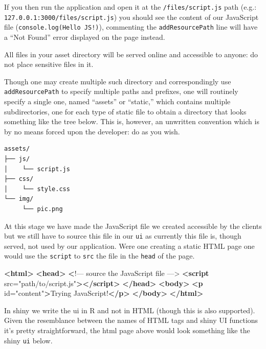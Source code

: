 \documentclass[
]{krantz}
\makeatletter
\newenvironment{Shaded}{\begin{snugshade}}{\end{snugshade}}
\newcommand{\ErrorTok}[1]{\textcolor[rgb]{0.14,0.14,0.14}{\textbf{#1}}}
\newcommand{\KeywordTok}[1]{\textcolor[rgb]{0.27,0.27,0.27}{\textbf{#1}}}
\newcommand{\NormalTok}[1]{#1}
\newcommand{\OtherTok}[1]{\textcolor[rgb]{0.37,0.37,0.37}{#1}}
\newcommand{\StringTok}[1]{\textcolor[rgb]{0.5,0.5,0.5}{#1}}
\newenvironment{kframe}{%
\medskip{}
\setlength{\fboxsep}{.8em}
 \def\at@end@of@kframe{}%
 \ifinner\ifhmode%
  \def\at@end@of@kframe{\end{minipage}}%
  \begin{minipage}{\columnwidth}%
 \fi\fi%
 \def\FrameCommand##1{\hskip\@totalleftmargin \hskip-\fboxsep
 \colorbox{shadecolor}{##1}\hskip-\fboxsep
     \hskip-\linewidth \hskip-\@totalleftmargin \hskip\columnwidth}%
 \MakeFramed {\advance\hsize-\width
   \@totalleftmargin\z@ \linewidth\hsize
   \@setminipage}}%
 {\par\unskip\endMakeFramed%
 \at@end@of@kframe}
\renewenvironment{Shaded}{\begin{kframe}}{\end{kframe}}
\makeatother
\begin{document}
If you then run the application and open it at the \texttt{/files/script.js} path (e.g.: \texttt{127.0.0.1:3000/files/script.js}) you should see the content of our JavaScript file (\texttt{console.log(\textquotesingle{}Hello\ JS!\textquotesingle{})}), commenting the \texttt{addResourcePath} line will have a ``Not Found'' error displayed on the page instead.

All files in your asset directory will be served online and accessible to anyone: do not place sensitive files in it.

Though one may create multiple such directory and correspondingly use \texttt{addResourcePath} to specify multiple paths and prefixes, one will routinely specify a single one, named ``assets'' or ``static,'' which contains multiple subdirectories, one for each type of static file to obtain a directory that looks something like the tree below. This is, however, an unwritten convention which is by no means forced upon the developer: do as you wish.

\begin{verbatim}
assets/
├── js/
│    └── script.js
├── css/
│    └── style.css
└── img/
     └── pic.png
\end{verbatim}

At this stage we have made the JavaScript file we created accessible by the clients but we still have to source this file in our \texttt{ui} as currently this file is, though served, not used by our application. Were one creating a static HTML page one would use the \texttt{script} to \texttt{src} the file in the \texttt{head} of the page.

\begin{Shaded}
\begin{Highlighting}[]
\KeywordTok{<html>}
  \KeywordTok{<head>}
    \ErrorTok{<}\NormalTok{!–– source the JavaScript file ––>}
    \KeywordTok{<script}\OtherTok{ src=}\StringTok{"path/to/script.js"}\KeywordTok{></script>}
  \KeywordTok{</head>}
  \KeywordTok{<body>}
    \KeywordTok{<p}\OtherTok{ id=}\StringTok{"content"}\KeywordTok{>}\NormalTok{Trying JavaScript!}\KeywordTok{</p>}
  \KeywordTok{</body>}
\KeywordTok{</html>}
\end{Highlighting}
\end{Shaded}

In shiny we write the ui in R and not in HTML (though this is also supported). Given the resemblance between the names of HTML tags and shiny UI functions it's pretty straightforward, the html page above would look something like the shiny \texttt{ui} below.
\end{document}
